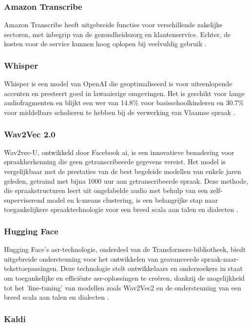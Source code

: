 \subsubsection{Amazon Transcribe}
Amazon Transcribe heeft uitgebreide functies voor verschillende zakelijke sectoren, met inbegrip van de gezondheidszorg en klantenservice. Echter, de kosten voor de service kunnen hoog oplopen bij veelvuldig gebruik \textcite{AmazonTranscribe2023}.

\subsubsection{Whisper}
 Whisper is een model van OpenAI die geoptimaliseerd is voor uiteenlopende accenten en presteert goed in lawaaierige omgevingen. Het is geschikt voor lange audiofragmenten en blijkt een \gls{wer} van 14.8\% voor basisschoolkinderen en 30.7\% voor middelbare scholieren te hebben bij de verwerking van Vlaamse spraak \autocite{whisper2023}.

\subsubsection{Wav2Vec 2.0}
Wav2vec-U, ontwikkeld door Facebook \gls{ai}, is een innovatieve benadering voor spraakherkenning die geen getranscribeerde gegevens vereist. Het model is vergelijkbaar met de prestaties van de best begeleide modellen van enkele jaren geleden, getraind met bijna 1000 uur aan getranscribeerde spraak. Deze methode, die spraakstructuren leert uit ongelabelde audio met behulp van een zelf-superviserend model en k-means clustering, is een belangrijke stap naar toegankelijkere spraaktechnologie voor een breed scala aan talen en dialecten \autocite{wav2vecu2021}.

\subsubsection{Hugging Face}
Hugging Face's \gls{asr}-technologie, onderdeel van de Transformers-bibliotheek, biedt uitgebreide ondersteuning voor het ontwikkelen van geavanceerde spraak-naar-teksttoepassingen. Deze technologie stelt ontwikkelaars en onderzoekers in staat om toegankelijke en efficiënte \gls{asr}-oplossingen te creëren, dankzij de mogelijkheid tot het 'fine-tuning' van modellen zoals Wav2Vec2 en de ondersteuning van een breed scala aan talen en dialecten \autocite{huggingface2023asr}.

\subsubsection{Kaldi}

